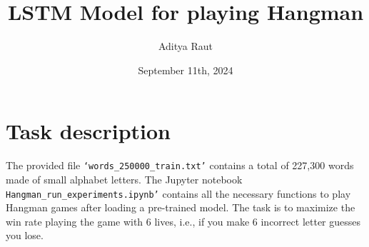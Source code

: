 \documentclass{article}
\title{\vspace{-60pt} LSTM Model for playing Hangman}
\author{\vspace{-5pt}Aditya Raut}
\date{\vspace{-5pt}September 11th, 2024}
\begin{document}
\maketitle

\vspace{-25pt}
\section{Task description}
The provided file \texttt{`words\_250000\_train.txt'} contains a total of 227,300 words made of small alphabet letters. The Jupyter notebook \texttt{Hangman\_run\_experiments.ipynb'} contains all the necessary functions to play Hangman games after loading a pre-trained model. The task is to maximize the win rate playing the game with 6 lives, i.e., if you make 6 incorrect letter guesses you lose. 

\vspace{-5pt}
\end{document}
